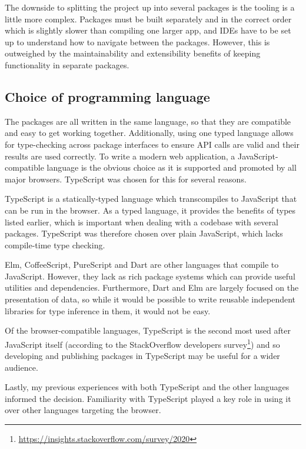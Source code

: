 \documentclass[a4paper,fleqn,oneside,12pt]{report}
\begin{document}
The downside to splitting the project up into several packages is the tooling is a little more complex. Packages must be built separately and in the correct order which is slightly slower than compiling one larger app, and IDEs have to be set up to understand how to navigate between the packages. However, this is outweighed by the maintainability and extensibility benefits of keeping functionality in separate packages.

\subsection{Choice of programming language}\label{id:h.dj2rwwqr30vu}

The packages are all written in the same language, so that they are compatible and easy to get working together. Additionally, using one typed language allows for type-checking across package interfaces to ensure API calls are valid and their results are used correctly. To write a modern web application, a JavaScript-compatible language is the obvious choice as it is supported and promoted by all major browsers. TypeScript was chosen for this for several reasons.

TypeScript is a statically-typed language which transcompiles to JavaScript that can be run in the browser. As a typed language, it provides the benefits of types listed earlier, which is important when dealing with a codebase with several packages. TypeScript was therefore chosen over plain JavaScript, which lacks compile-time type checking.

Elm, CoffeeScript, PureScript and Dart are other languages that compile to JavaScript. However, they lack as rich package systems which can provide useful utilities and dependencies. Furthermore, Dart and Elm are largely focused on the presentation of data, so while it would be possible to write reusable independent libraries for type inference in them, it would not be easy.

Of the browser-compatible languages, TypeScript is the second most used after JavaScript itself (according to the StackOverflow developers survey\footnote{\underline{\href{https://insights.stackoverflow.com/survey/2020\#technology-programming-scripting-and-markup-languages}{https://insights.stackoverflow.com/survey/2020}}}) and so developing and publishing packages in TypeScript may be useful for a wider audience.

Lastly, my previous experiences with both TypeScript and the other languages informed the decision. Familiarity with TypeScript played a key role in using it over other languages targeting the browser.
\end{document}
